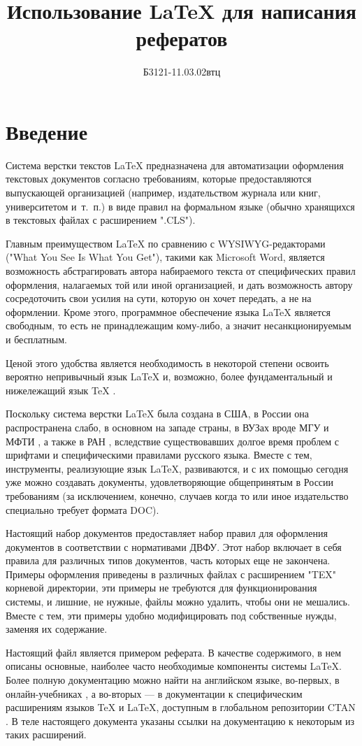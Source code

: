 \documentclass[report, draught]{fefudoc}
\author{Б3121-11.03.02втц}{Сидоров Иван Петрович}
\title{Использование \LaTeX{} для написания рефератов} %
\begin{document}
\frontpage
\tableofcontents

\section*{Введение}
Система верстки текстов \LaTeX{} \cite{Lamport96} предназначена для автоматизации оформления текстовых документов согласно требованиям, которые предоставляются выпускающей организацией (например, издательством журнала или книг, университетом и~т.~п.) в виде правил на формальном языке (обычно хранящихся в текстовых файлах с расширением ".CLS").

Главным преимуществом \LaTeX{} по сравнению с WYSIWYG-редакторами ("What You See Is What You Get"), такими как Microsoft Word, является возможность абстрагировать автора набираемого текста от специфических правил оформления, налагаемых той или иной организацией, и дать возможность автору сосредоточить свои усилия на сути, которую он хочет передать, а не на оформлении.
Кроме этого, программное обеспечение языка \LaTeX{} является свободным, то есть не принадлежащим кому-либо, а значит несанкционируемым и бесплатным.

Ценой этого удобства является необходимость в некоторой степени освоить вероятно непривычный язык \LaTeX{} и, возможно, более фундаментальный  и нижележащий язык \TeX{} \cite{TheTexBook}.

Поскольку система верстки \LaTeX{} была создана в США, в России она распространена слабо, в основном на западе страны, в ВУЗах вроде МГУ и МФТИ \cite{ctan-disser-mipt}, а также в РАН \cite{RAS-latex}, вследствие существовавших долгое время проблем с шрифтами и специфическими правилами русского языка.
Вместе с тем, инструменты, реализующие язык \LaTeX{}, развиваются, и с их помощью сегодня уже можно создавать документы, удовлетворяющие общепринятым в России требованиям (за исключением, конечно, случаев когда то или иное издательство специально требует формата DOC).

Настоящий набор документов предоставляет набор правил для оформления документов в соответствии с нормативами ДВФУ.
Этот набор включает в себя правила для различных типов документов, часть которых еще не закончена.
Примеры оформления приведены в различных файлах с расширением "TEX" корневой директории, эти примеры не требуются для функционирования системы, и лишние, не нужные, файлы можно удалить, чтобы они не мешались.
Вместе с тем, эти примеры удобно модифицировать под собственные нужды, заменяя их содержание.

Настоящий файл является примером реферата.
В качестве содержимого, в нем описаны основные, наиболее часто необходимые компоненты системы \LaTeX{}.
Более полную документацию можно найти на английском языке, во-первых, в онлайн-учебниках \cite{latex-wikibooks, latex-overleaf}, а во-вторых --- в документации к специфическим расширениям языков \TeX{} и \LaTeX{}, доступным в глобальном репозитории CTAN \cite{CTAN}.
В теле настоящего документа указаны ссылки на документацию к некоторым из таких расширений.
\end{document}
